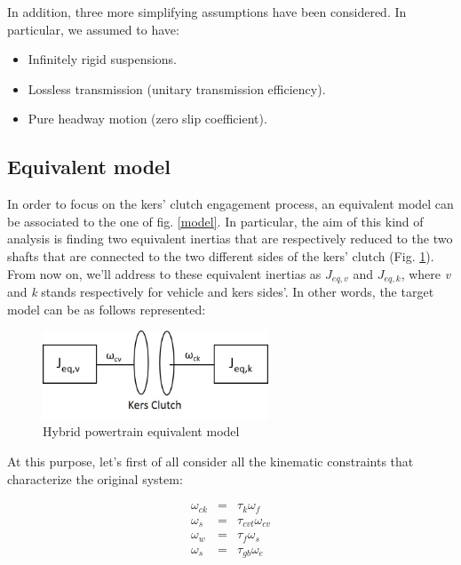 \documentclass[11pt]{article}
\begin{document}
In addition, three more simplifying assumptions have been considered. In particular, we assumed to have: 

\begin{itemize}
	\item Infinitely rigid suspensions.
	\item Lossless transmission (unitary transmission efficiency).
	\item Pure headway motion (zero slip coefficient).
\end{itemize}

\subsection{Equivalent model}

In order to focus on the kers' clutch engagement process, an equivalent model can be associated to the one of fig. \ref{model}. In particular, the aim of this kind of analysis is finding two equivalent inertias that are respectively reduced to the two shafts that are connected to the two different sides of the kers' clutch (Fig. \ref{eq_model}).
From now on, we'll address to these equivalent inertias as $J_{eq,v}$ and $J_{eq,k}$, where \textit{v} and \textit{k} stands respectively for vehicle and kers sides'.
In other words, the target model can be as follows represented:

\begin{figure}[H]
\centering
\includegraphics[width=0.6\textwidth]{Images/Model/Equivalent_model.jpg}
\caption{Hybrid powertrain equivalent model}
\label{eq_model}
\end{figure}

At this purpose, let's first of all consider all the kinematic constraints that characterize the original system:

\begin{eqnarray}
	\omega_{ck}&=&\tau_k \omega_f\\
	\omega_s &=&\tau_{cvt} \omega_{cv}\\
	\omega_w &=&\tau_f \omega_s\\
	\omega_s &=&\tau_{gb} \omega_e
\end{eqnarray}
\end{document}
